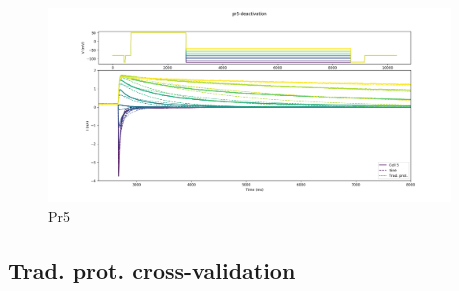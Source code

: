 \documentclass[preprint,authoryear,10pt]{elsarticle}
\begin{document}
\begin{figure}[H]
\centerline{
\includegraphics[width=0.95\textwidth]{fig/validation-pr5}
}
\caption{%
Pr5
}
\label{fig:validation-pr5}
\end{figure}




%
%
\subsection{Trad. prot. cross-validation}
\end{document}
